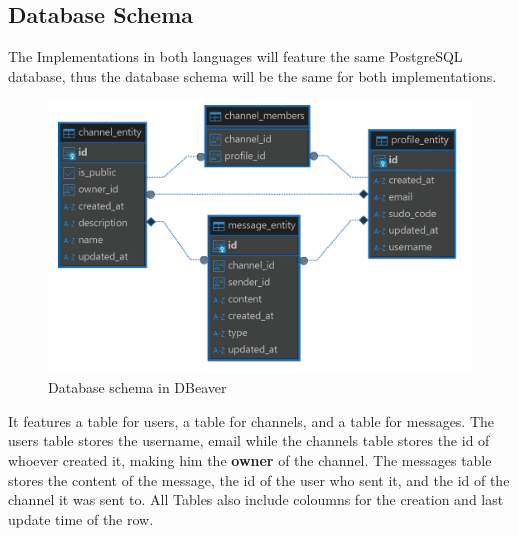 \documentclass[a4paper,12pt]{article}
\begin{document}
	\newpage
	\subsection{Database Schema}
	\label{subsec:database_schema}
	The Implementations in both languages will feature the same PostgreSQL database, thus the database schema will 
	be the same for both implementations.
	\begin{figure}[h]
		\centering
		\includegraphics[width=\textwidth]{dbeaver_database_representation.png}
		\caption{Database schema in DBeaver}
		\label{fig:dbeaver_database_representation}
	\end{figure}

	It features a table for users, a table for channels, and a table for messages. The users table stores the username, email
	while the channels table stores the id of whoever created it, making him the \textbf{owner} of the channel. The messages table
	stores the content of the message, the id of the user who sent it, and the id of the channel it was sent to. All Tables also
	include coloumns for the creation and last update time of the row.
\end{document}
